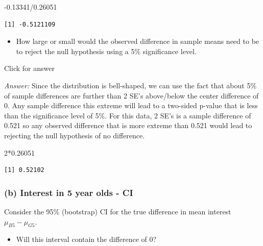 \documentclass[
]{book}
\newenvironment{Shaded}{\begin{snugshade}}{\end{snugshade}}
\newcommand{\DecValTok}[1]{\textcolor[rgb]{0.00,0.00,0.81}{#1}}
\newcommand{\FloatTok}[1]{\textcolor[rgb]{0.00,0.00,0.81}{#1}}
\newcommand{\SpecialCharTok}[1]{\textcolor[rgb]{0.00,0.00,0.00}{#1}}
\providecommand{\tightlist}{%
  \setlength{\itemsep}{0pt}\setlength{\parskip}{0pt}}
\begin{document}
\begin{Shaded}
\begin{Highlighting}[]
\SpecialCharTok{{-}}\FloatTok{0.13341}\SpecialCharTok{/}\FloatTok{0.26051} 
\end{Highlighting}
\end{Shaded}

\begin{verbatim}
[1] -0.5121109
\end{verbatim}

\begin{itemize}
\tightlist
\item
  How large or small would the observed difference in sample means need to be to reject the null hypothesis using a 5\% significance level.
\end{itemize}

Click for answer

\emph{Answer:} Since the distribution is bell-shaped, we can use the fact that about 5\% of sample differences are further than 2 SE's above/below the center difference of 0. Any sample difference this extreme will lead to a two-sided p-value that is less than the significance level of 5\%. For this data, 2 SE's is a sample difference of 0.521 so any observed difference that is more extreme than 0.521 would lead to rejecting the null hypothesis of no difference.

\begin{Shaded}
\begin{Highlighting}[]
\DecValTok{2}\SpecialCharTok{*}\FloatTok{0.26051} 
\end{Highlighting}
\end{Shaded}

\begin{verbatim}
[1] 0.52102
\end{verbatim}

\hypertarget{b-interest-in-5-year-olds---ci}{%
\subsubsection{(b) Interest in 5 year olds - CI}\label{b-interest-in-5-year-olds---ci}}

Consider the 95\% (bootstrap) CI for the true difference in mean interest \(\mu_{B5} - \mu_{G5}\).

\begin{itemize}
\tightlist
\item
  Will this interval contain the difference of 0?
\end{itemize}
\end{document}
